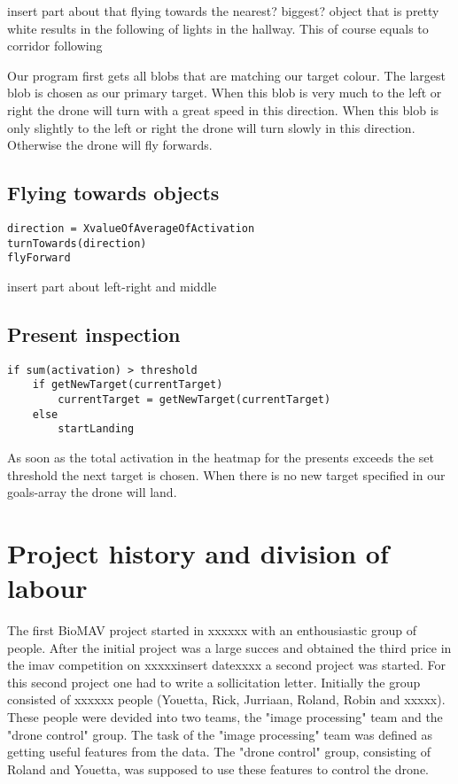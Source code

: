 \documentclass[a4paper,10pt]{article}
\begin{document}
insert part about that flying towards the nearest? biggest? object that is pretty white results in the following of lights in the hallway. This of course equals to corridor following

Our program first gets all blobs that are matching our target colour. 
The largest blob is chosen as our primary target. 
When this blob is very much to the left or right the drone will turn with a great speed in this direction. 
When this blob is only slightly to the left or right the drone will turn slowly in this direction. 
Otherwise the drone will fly forwards. 

\subsection{Flying towards objects}
\begin{verbatim}
direction = XvalueOfAverageOfActivation
turnTowards(direction)
flyForward
\end{verbatim}

insert part about left-right and middle 

\subsection{Present inspection}
\begin{verbatim}
if sum(activation) > threshold
	if getNewTarget(currentTarget)
		currentTarget = getNewTarget(currentTarget)
	else
		startLanding
\end{verbatim}

As soon as the total activation in the heatmap for the presents exceeds the set threshold the next target is chosen. 
When there is no new target specified in our goals-array the drone will land. 

\section{Project history and division of labour}
The first BioMAV project started in xxxxxx with an enthousiastic group of people. After the initial project was a large succes and obtained the third price in the imav competition on xxxxxinsert datexxxx a second project was started.
For this second project one had to write a sollicitation letter. 
Initially the group consisted of xxxxxx people (Youetta, Rick, Jurriaan, Roland, Robin and xxxxx).  
These people were devided into two teams, the "image processing" team and the "drone control" group. 
The task of the "image processing" team was defined as getting useful features from the data. 
The "drone control" group, consisting of Roland and Youetta, was supposed to use these features to control the drone.  
\end{document}
